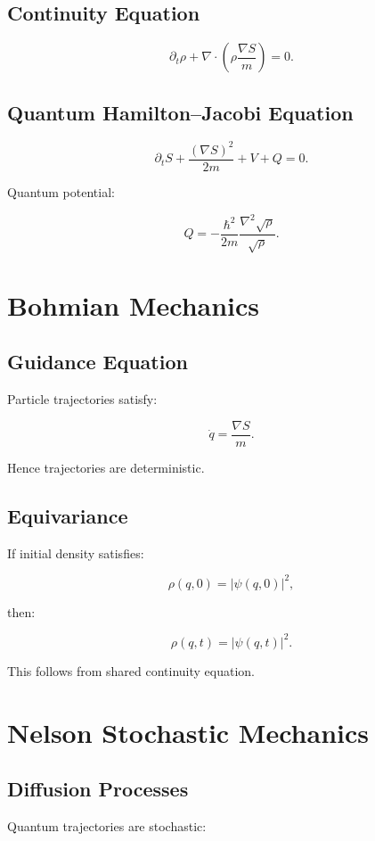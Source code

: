 \documentclass[11pt]{book}
\begin{document}
\section{Continuity Equation}

\[
\partial_t \rho
+
\nabla\cdot
\left(
\rho \frac{\nabla S}{m}
\right)
=0.
\]

\section{Quantum Hamilton--Jacobi Equation}

\[
\partial_t S
+
\frac{(\nabla S)^2}{2m}
+
V
+
Q
=0.
\]

Quantum potential:

\[
Q
=
-\frac{\hbar^2}{2m}
\frac{\nabla^2\sqrt\rho}{\sqrt\rho}.
\]

\chapter{Bohmian Mechanics}

\section{Guidance Equation}

Particle trajectories satisfy:

\[
\dot q
=
\frac{\nabla S}{m}.
\]

Hence trajectories are deterministic.

\section{Equivariance}

If initial density satisfies:

\[
\rho(q,0)=|\psi(q,0)|^2,
\]

then:

\[
\rho(q,t)=|\psi(q,t)|^2.
\]

This follows from shared continuity equation.

\chapter{Nelson Stochastic Mechanics}

\section{Diffusion Processes}

Quantum trajectories are stochastic:
\end{document}
